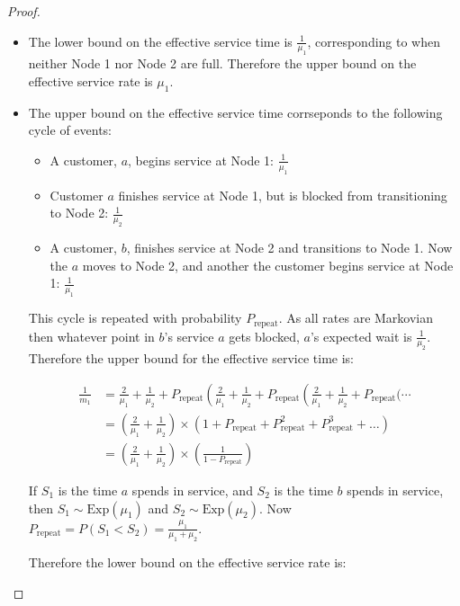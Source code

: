 \documentclass{article}
\begin{document}
\begin{proof}
\begin{enumerate}
\begin{itemize}
\begin{itemize}

\item The lower bound on the effective service time is $\frac{1}{\mu_1}$, corresponding to when neither Node 1 nor Node 2 are full.
Therefore the upper bound on the effective service rate is $\mu_1$.

\item The upper bound on the effective service time corrseponds to the following cycle of events:

\begin{itemize}
  \item A customer, $a$, begins service at Node 1: $\frac{1}{\mu_1}$
  \item Customer $a$ finishes service at Node 1, but is blocked from transitioning to Node 2: $\frac{1}{\mu_2}$
  \item A customer, $b$, finishes service at Node 2 and transitions to Node 1. Now the $a$ moves to Node 2, and another the customer begins service at Node 1: $\frac{1}{\mu_1}$
\end{itemize}

This cycle is repeated with probability $P_{\text{repeat}}$.
As all rates are Markovian then whatever point in $b$'s service $a$ gets blocked, $a$'s expected wait is $\frac{1}{\mu_2}$.
Therefore the upper bound for the effective service time is:

\begin{align*}
  \frac{1}{m_1} & = \frac{2}{\mu_1} + \frac{1}{\mu_2} + P_{\text{repeat}} \left( \frac{2}{\mu_1} + \frac{1}{\mu_2} + P_{\text{repeat}} \left( \frac{2}{\mu_1} + \frac{1}{\mu_2} + P_{\text{repeat}} \bigg( \dotsi \right. \right. \\
  & = \left( \frac{2}{\mu_1} + \frac{1}{\mu_2} \right) \times \left( 1 + P_{\text{repeat}} + P_{\text{repeat}}^2 + P_{\text{repeat}}^3 + \dots \right) \\
  & = \left( \frac{2}{\mu_1} + \frac{1}{\mu_2} \right) \times \left( \frac{1}{1 - P_{\text{repeat}}} \right)
\end{align*}

If $S_1$ is the time $a$ spends in service, and $S_2$ is the time $b$ spends in service, then $S_1 \sim \text{Exp}(\mu_1)$ and $S_2 \sim \text{Exp}(\mu_2)$.
Now $P_{\text{repeat}} = P(S_1 < S_2) = \frac{\mu_1}{\mu_1 + \mu_2}$.

Therefore the lower bound on the effective service rate is:


\end{itemize}
\end{itemize}
\end{enumerate}
\end{proof}
\end{document}
